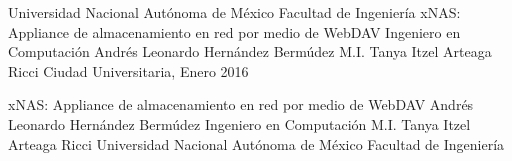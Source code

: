 \documentclass[dvips,letterpaper,12pt,twoside,spanish,headsepline,headinclude]{report}
\begin{document}


{
\pagestyle{empty}
\thesistitle
	{Universidad Nacional Aut\'{o}noma de M\'{e}xico}
	{Facultad de Ingenier\'{i}a}
	{xNAS: Appliance de almacenamiento en red por medio de WebDAV}
	{Ingeniero en Computaci\'{o}n}
	{Andr\'{e}s Leonardo Hern\'{a}ndez Berm\'{u}dez}
	{M.I. Tanya Itzel Arteaga Ricci}
	{Ciudad Universitaria, Enero 2016}

\thesispdfinfo
	{xNAS: Appliance de almacenamiento en red por medio de WebDAV}
	{Andr\'{e}s Leonardo Hern\'{a}ndez Berm\'{u}dez}
	{Ingeniero en Computaci\'{o}n}
	{M.I. Tanya Itzel Arteaga Ricci}
	{Universidad Nacional Aut\'{o}noma de M\'{e}xico}
	{Facultad de Ingenier\'{i}a}

 
 
 
%	
 
 
}

{
\pagestyle{headings}






\appendix

}
{

%

\newpage\null\thispagestyle{empty}\newpage
}
\end{document}
